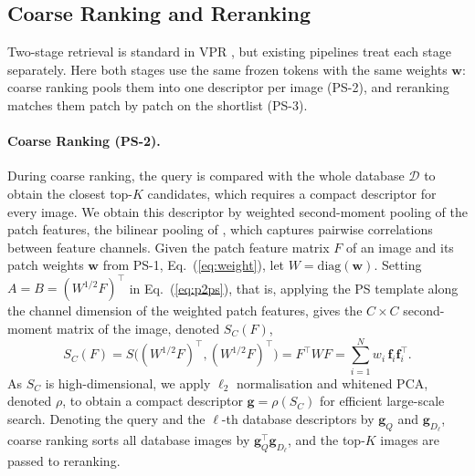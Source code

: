 \subsection{Coarse Ranking and Reranking}
\label{sec:coarse_to_fine_ranking}
Two-stage retrieval is standard in VPR \citep{patchnetvlad,r2former,selavpr}, but existing pipelines treat each stage separately. Here both stages use the same frozen tokens with the same weights $\mathbf w$: coarse ranking pools them into one descriptor per image (PS-2), and reranking matches them patch by patch on the shortlist (PS-3).

\paragraph{Coarse Ranking (PS-2).}
\label{sec:global}
During coarse ranking, the query is compared with the whole database $\mathcal D$ to obtain the closest top-$K$ candidates, which requires a compact descriptor for every image. We obtain this descriptor by weighted second-moment pooling of the patch features, the bilinear pooling of \citet{bcnn}, which captures pairwise correlations between feature channels. Given the patch feature matrix $F$ of an image and its patch weights $\mathbf w$ from PS-1, Eq.~(\ref{eq:weight}), let $W=\mathrm{diag}(\mathbf w)$. Setting $A=B=(W^{1/2}F)^{\top}$ in Eq.~(\ref{eq:p2ps}), that is, applying the PS template along the channel dimension of the weighted patch features, gives the $C\times C$ second-moment matrix of the image, denoted $S_C(F)$,
\begin{equation}\label{eq:gc}
  S_C(F)=S\big((W^{1/2}F)^{\top},(W^{1/2}F)^{\top}\big)=F^{\top}WF=\sum_{i=1}^{N} w_i\,\mathbf f_i\mathbf f_i^{\top}.
\end{equation}
As $S_C$ is high-dimensional, we apply $\ell_2$ normalisation and whitened PCA, denoted $\rho$, to obtain a compact descriptor $\mathbf g=\rho(S_C)$ for efficient large-scale search.  %
Denoting the query and the $\ell$-th database descriptors by $\mathbf g_Q$ and $\mathbf g_{D_\ell}$, coarse ranking sorts all database images by $\mathbf g_Q^{\top}\mathbf g_{D_\ell}$, and the top-$K$ images are passed to reranking.

